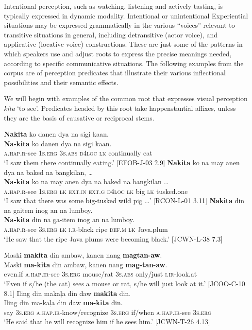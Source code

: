 Intentional perception, such as watching, listening and actively tasting, is typically expressed in dynamic modality. Intentional or unintentional Experiential situations may be expressed grammatically in the various “voices” relevant to transitive situations in general, including detransitive (actor voice), and applicative (locative voice) constructions. These are just some of the patterns in which speakers use and adjust roots to express the precise meanings needed, according to specific communicative situations. The following examples from the corpus are of perception predicates that illustrate their various inflectional possibilities and their semantic effects.

We will begin with examples of the common root that expresses visual perception \textit{kita} ‘to see’. Predicates headed by this root take happenstantial affixes, unless they are the basis of causative or reciprocal stems.

\ea
\textbf{Nakita}  ko  danen  dya  na  sigi  kaan. \\\smallskip
\gll \textbf{Na-kita}  ko  danen  dya  na  sigi  kaan. \\
\textsc{a.hap.r}-see  1\textsc{s.erg}  3\textsc{s.abs}  \textsc{d4loc}  \textsc{lk}  continually  eat \\
\glt ‘I saw them there continually eating.’ [EFOB-J-03 2.9]
\z
\ea
\textbf{Nakita}  ko  na  may  anen  dya  na  baked  na  bangkilan, … \\\smallskip
\gll \textbf{Na-kita}  ko  na  may  anen  dya  na  baked  na  bangkilan  … \\
\textsc{a.hap.r}-see  1\textsc{s.erg}  \textsc{lk}  \textsc{ext.in}  \textsc{ext.g}  \textsc{d4loc}  \textsc{lk}  big  \textsc{lk}  tusked.one \\
\glt ‘I saw that there was some big-tusked wild pig  …’ [RCON-L-01 3.11]
\z
\ea
\textbf{Nakita}  din  na  gaitem  inog  an  na  lumboy. \\\smallskip
\gll \textbf{Na-kita}  din  na  ga-item  inog  an  na  lumboy. \\
\textsc{a.hap.r}-see  3\textsc{s.erg}  \textsc{lk}  \textsc{i.r}-black  ripe \textsc{def.m}  \textsc{lk}  Java.plum \\
\glt ‘He saw that the ripe Java plums were becoming black.’ [JCWN-L-38 7.3]
\z

\newpage
\ea
Maski  \textbf{makita}  din  ambaw,  kanen  nang  \textbf{magtan-aw}. \\\smallskip
\gll Maski  \textbf{ma-kita}  din  ambaw,  kanen  nang  \textbf{mag-tan-aw}. \\
even.if  \textsc{a.hap.ir}-see  3\textsc{s.erg}   mouse/rat  3\textsc{s.abs}  only/just  \textsc{i.ir}-look.at \\
\glt ‘Even if s/he (the cat) sees a mouse or rat, s/he will just look at it.’ [JCOO-C-10 8.1]
\z
\ea
Iling  din  makaļa  din  daw  \textbf{makita}  din.\\\smallskip
\gll Iling  din  ma-kaļa  din  daw  \textbf{ma-kita}  din.\\
say  3\textsc{s.erg}  \textsc{a.hap.ir}-know/recognize  3\textsc{s.erg}  if/when  \textsc{a.hap.ir}-see  3\textsc{s.erg}\\
\glt ‘He said that he will recognize him if he sees him.' [JCWN-T-26 4.13]
\z

